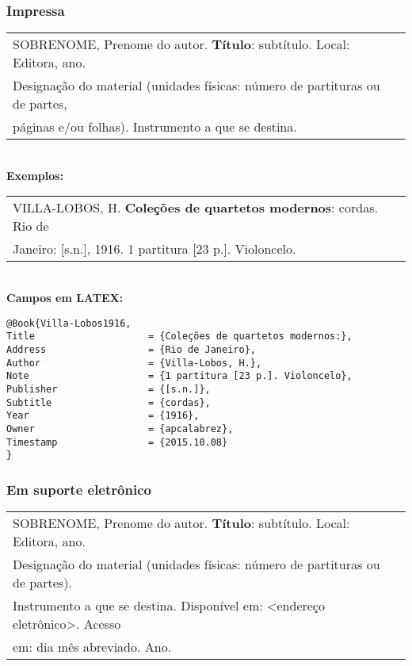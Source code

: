 \subsubsection{Impressa}


\begin{tabular}{|l|c|} \hline
SOBRENOME, Prenome do autor. \textbf{Título}: subtítulo. Local: Editora, ano.\\
Designação do material (unidades físicas: número de partituras ou de partes,\\
páginas e/ou folhas). Instrumento a que se destina. 
	\\\hline
\end{tabular} \\

\textbf{Exemplos:} \\

\begin{tabular}{|l|c|} \hline
VILLA-LOBOS, H. \textbf{Coleções de quartetos modernos}: cordas. Rio de \\Janeiro: [s.n.], 1916. 1 partitura [23 p.]. Violoncelo. 
	\\\hline
\end{tabular} \\

\textbf{Campos em LATEX:} 

\begin{verbatim}
@Book{Villa-Lobos1916,
Title                    = {Coleções de quartetos modernos:},
Address                  = {Rio de Janeiro},
Author                   = {Villa-Lobos, H.},
Note                     = {1 partitura [23 p.]. Violoncelo},
Publisher                = {[s.n.]},
Subtitle                 = {cordas},
Year                     = {1916},
Owner                    = {apcalabrez},
Timestamp                = {2015.10.08}
}
\end{verbatim}

\subsubsection{Em suporte eletrônico}

\begin{tabular}{|l|c|} \hline
	SOBRENOME, Prenome do autor. \textbf{Título}: subtítulo. Local: Editora,
	ano. \\Designação do material (unidades físicas: número de
	partituras ou de partes).\\Instrumento a que se destina. Disponível
	em: <endereço eletrônico>. Acesso \\em: dia mês abreviado. Ano. 
	\\\hline
\end{tabular} \\

